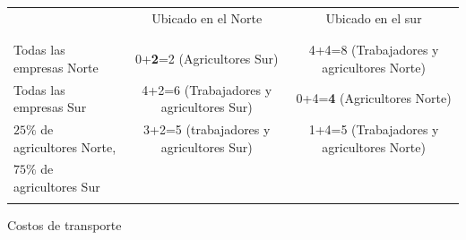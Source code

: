 \begin{center}
    \begin{tabular}{lcc}
	& Ubicado en el Norte & Ubicado en el sur \\\\
	\hline\\
	Todas las empresas Norte & 0+\textbf{2}=2 (Agricultores Sur) & 4+4=8 (Trabajadores y agricultores Norte)\\
	Todas las empresas Sur &4+2=6 (Trabajadores y agricultores Sur)& 0+4=\textbf{4} (Agricultores Norte)\\
	$25\%$ de agricultores Norte, & 3+2=5 (trabajadores y agricultores Sur) & 1+4=5 (Trabajadores y agricultores Norte)\\
	$75\%$ de agricultores Sur & &  \\
	\hline\\
    \end{tabular}
    Costos de transporte
\end{center}
\vspace{.5cm}


